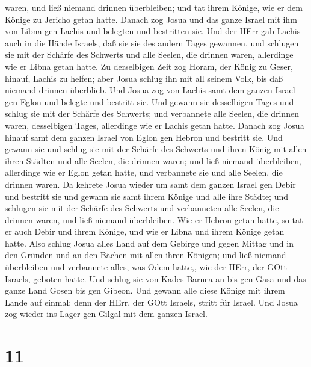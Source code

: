 waren, und ließ niemand drinnen überbleiben; und tat ihrem Könige, wie
er dem Könige zu Jericho getan hatte.  Danach zog Josua und
das ganze Israel mit ihm von Libna gen Lachis und belegten und
bestritten sie.  Und der HErr gab Lachis auch in die Hände
Israels, daß sie sie des andern Tages gewannen, und schlugen sie mit der
Schärfe des Schwerts und alle Seelen, die drinnen waren, allerdinge wie
er Libna getan hatte.  Zu derselbigen Zeit zog Horam, der
König zu Geser, hinauf, Lachis zu helfen; aber Josua schlug ihn mit all
seinem Volk, bis daß niemand drinnen überblieb.  Und Josua
zog von Lachis samt dem ganzen Israel gen Eglon und belegte und bestritt
sie.  Und gewann sie desselbigen Tages und schlug sie mit
der Schärfe des Schwerts; und verbannete alle Seelen, die drinnen waren,
desselbigen Tages, allerdinge wie er Lachis getan hatte. 
Danach zog Josua hinauf samt dem ganzen Israel von Eglon gen Hebron und
bestritt sie.  Und gewann sie und schlug sie mit der
Schärfe des Schwerts und ihren König mit allen ihren Städten und alle
Seelen, die drinnen waren; und ließ niemand überbleiben, allerdinge wie
er Eglon getan hatte, und verbannete sie und alle Seelen, die drinnen
waren.  Da kehrete Josua wieder um samt dem ganzen Israel
gen Debir und bestritt sie  und gewann sie samt ihrem
Könige und alle ihre Städte; und schlugen sie mit der Schärfe des
Schwerts und verbanneten alle Seelen, die drinnen waren, und ließ
niemand überbleiben. Wie er Hebron getan hatte, so tat er auch Debir und
ihrem Könige, und wie er Libna und ihrem Könige getan hatte.
 Also schlug Josua alles Land auf dem Gebirge und gegen
Mittag und in den Gründen und an den Bächen mit allen ihren Königen; und
ließ niemand überbleiben und verbannete alles, was Odem hatte,, wie der
HErr, der GOtt Israels, geboten hatte.  Und schlug sie von
Kades-Barnea an bis gen Gasa und das ganze Land Gosen bis gen Gibeon.
 Und gewann alle diese Könige mit ihrem Lande auf einmal;
denn der HErr, der GOtt Israels, stritt für Israel.  Und
Josua zog wieder ins Lager gen Gilgal mit dem ganzen Israel.

\hypertarget{section-10}{%
\section{11}\label{section-10}}

